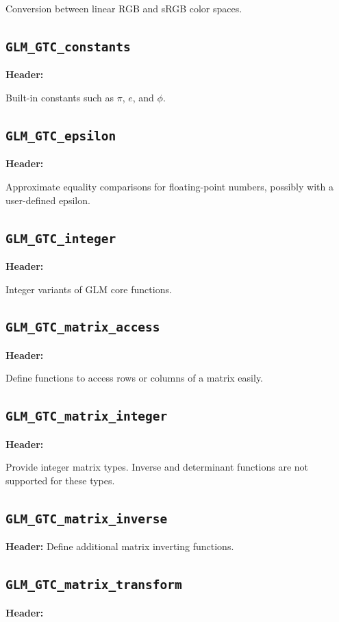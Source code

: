 \documentclass{scrartcl}
\numberwithin{figure}{subsection}
\begin{document}
Conversion between linear RGB and sRGB color spaces.

\subsection{\texttt{GLM\_GTC\_constants}}
\textbf{Header:} 

Built-in constants such as $\pi$, $e$, and $\phi$.

\subsection{\texttt{GLM\_GTC\_epsilon}}
\textbf{Header:} 

Approximate equality comparisons for floating-point numbers, possibly with a user-defined epsilon.

\subsection{\texttt{GLM\_GTC\_integer}}
\textbf{Header:} 

Integer variants of GLM core functions. 

\subsection{\texttt{GLM\_GTC\_matrix\_access}}
\textbf{Header:} 

Define functions to access rows or columns of a matrix easily.

\subsection{\texttt{GLM\_GTC\_matrix\_integer}}
\textbf{Header:} 

Provide integer matrix types. Inverse and determinant functions are not supported for these types.

\subsection{\texttt{GLM\_GTC\_matrix\_inverse}}
\textbf{Header:} 
Define additional matrix inverting functions. 

\subsection{\texttt{GLM\_GTC\_matrix\_transform}}
\textbf{Header:} 
\end{document}
